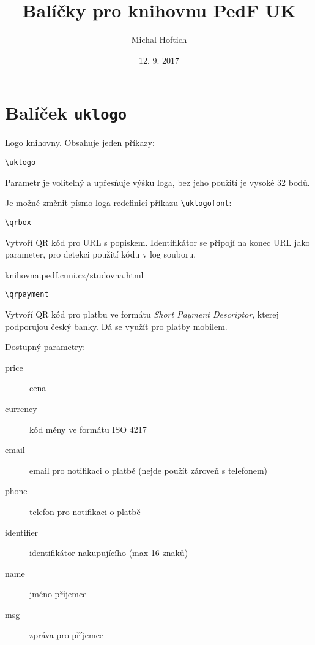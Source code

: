 \documentclass{ltxdoc}
\begin{document}
\title{Balíčky pro knihovnu PedF UK}
\author{Michal Hoftich}
\date{12. 9. 2017}
\maketitle

\section{Balíček \texttt{uklogo}}

Logo knihovny. Obsahuje jeden příkazy:

\noindent\verb|\uklogo|

\begin{LTXexample}
  \uklogo
  \uklogo[24pt]
\end{LTXexample}

Parametr je volitelný a upřesňuje výšku loga, bez jeho použití je vysoké 32 bodů.

Je možné změnit písmo loga redefinicí příkazu \verb|\uklogofont|:

\begin{LTXexample}
  \renewfontfamily{}
  \uklogo
\end{LTXexample}

\noindent\verb|\qrbox|

Vytvoří QR kód pro URL s popiskem. Identifikátor se připojí na konec URL jako parameter,
pro detekci použití kódu v log souboru.


\begin{LTXexample}
{knihovna.pedf.cuni.cz/studovna.html}
\end{LTXexample}

\noindent \verb|\qrpayment|

Vytvoří QR kód pro platbu ve formátu \textit{Short Payment Descriptor}, kterej podporujou český banky. 
Dá se využít pro platby mobilem.

\begin{LTXexample}
\end{LTXexample}

Dostupný parametry:

\begin{description}
  \item[price] cena
  \item[currency] kód měny ve formátu ISO 4217
  \item[email] email pro notifikaci o platbě (nejde použít zároveň s telefonem)
  \item[phone] telefon pro notifikaci o platbě 
  \item[identifier] identifikátor nakupujícího (max 16 znaků)
  \item[name] jméno příjemce
  \item[msg] zpráva pro příjemce
\end{description}
\end{document}
